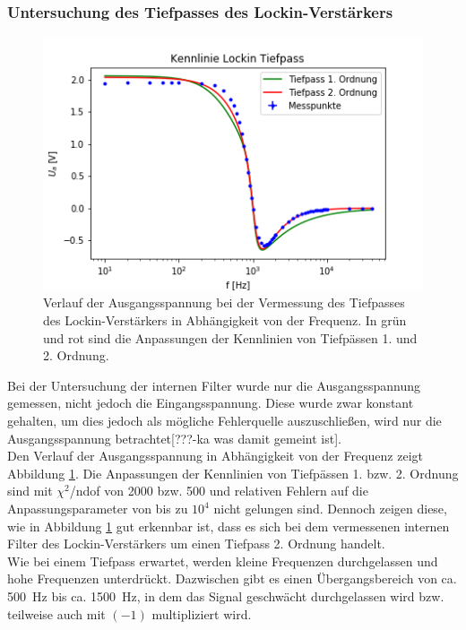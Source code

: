 \documentclass[12pt,a4paper]{article}
\begin{document}
\subsubsection{Untersuchung des Tiefpasses des Lockin-Verstärkers}

\begin{figure}
\centering
\includegraphics[scale=1]{Bilder/Vorversuch2/KennlinieTiefpass.png}
\caption[test]{Verlauf der Ausgangsspannung bei der Vermessung des Tiefpasses des Lockin-Verstärkers in Abhängigkeit von der Frequenz. In grün und rot sind die Anpassungen der Kennlinien von Tiefpässen 1. und 2. Ordnung.}
\label{fig:LockinTiefpass_Verlauf}
\end{figure}

Bei der Untersuchung der internen Filter wurde nur die Ausgangsspannung gemessen, nicht jedoch die Eingangsspannung. Diese wurde zwar konstant gehalten, um dies jedoch als mögliche Fehlerquelle auszuschließen, wird nur die Ausgangsspannung betrachtet[???-ka was damit gemeint ist]. \\
Den Verlauf der Ausgangsspannung in Abhängigkeit von der Frequenz zeigt Abbildung \ref{fig:LockinTiefpass_Verlauf}. Die Anpassungen der Kennlinien von Tiefpässen 1. bzw. 2. Ordnung sind mit $\chi ^2$/ndof von 2000 bzw. 500 und relativen Fehlern auf die Anpassungsparameter von bis zu $10^4$ nicht gelungen sind. Dennoch zeigen diese, wie in Abbildung \ref{fig:LockinTiefpass_Verlauf} gut erkennbar ist, dass es sich bei dem vermessenen internen Filter des Lockin-Verstärkers um einen Tiefpass 2. Ordnung handelt. \\
Wie bei einem Tiefpass erwartet, werden kleine Frequenzen durchgelassen und hohe Frequenzen unterdrückt. Dazwischen gibt es einen Übergangsbereich von ca. \SI{500}{Hz} bis ca. \SI{1500}{Hz}, in dem das Signal geschwächt durchgelassen wird bzw. teilweise auch mit $(-1)$ multipliziert wird.
\end{document}
